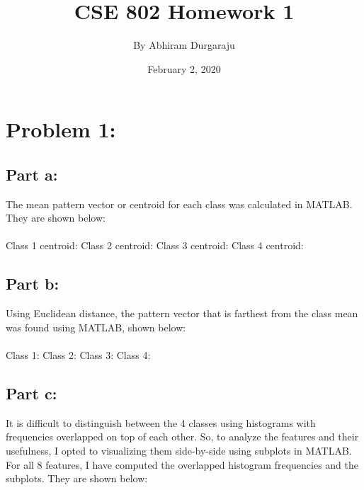 \documentclass[a4paper,12pt]{article}
\begin{document}
\title{CSE 802 Homework 1}
\author{By Abhiram Durgaraju}
\date{February 2, 2020}
\maketitle
\pagestyle{empty}
\pagebreak
\section*{Problem 1:}
\subsection*{Part a:}
The mean pattern vector or centroid for each class was calculated in MATLAB. They are shown below:\\ \\
Class 1 centroid: 
\newline
[7.3333, 9.2083, 8.1875, 5.9375, 9.3125, 11.4375, 3.1458, 3.7708]
\newline
Class 2 centroid:
\newline
[5.6666, 5.1250, 5.3750, 6.0625, 4.6458, 4.6041, 7.8958, 9.4375]
\newline
Class 3 centroid:
\newline
[7.3125, 7.2083, 6.7291, 5.9791, 5.3333, 5.4791, 3.7291, 4.2083]
\newline
Class 4 centroid:
\newline
[8.2708, 8.0833, 7.2500, 6.0000, 9.1875, 9.6250, 6.4166, 7.4375]
\\
\subsection*{Part b:}
Using Euclidean distance, the pattern vector that is farthest from the class mean was  found using MATLAB, shown below: \\ \\
Class 1: \newline
[12     9     7    13    13     8     3     2] 
\newline
Class 2: \newline
[6     6     4    16     4     4     4    14]
\newline
Class 3: \newline
[6     6     5     5     4     4     0     2]
\newline
Class 4: \newline
[2     3    12     7     8    12     7     8] 
\newline

\subsection*{Part c:}
It is difficult to distinguish between the 4 classes using histograms with frequencies overlapped on top of each other. So, to analyze the features and their usefulness, I opted to visualizing them side-by-side using subplots in MATLAB. For all 8 features, I have computed the overlapped histogram frequencies and the subplots. They are shown below:
\pagebreak
\end{document}
